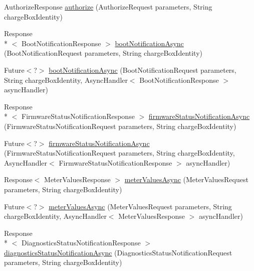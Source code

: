 \begin{DoxyCompactItemize}
\item 
Authorize\-Response \hyperlink{classde_1_1rwth_1_1idsg_1_1steve_1_1ocpp_1_1soap_1_1_central_system_service12___soap_server_a4df12c49aa3af8096172315620f75d17}{authorize} (Authorize\-Request parameters, String charge\-Box\-Identity)
\item 
Response\\*
$<$ Boot\-Notification\-Response $>$ \hyperlink{classde_1_1rwth_1_1idsg_1_1steve_1_1ocpp_1_1soap_1_1_central_system_service12___soap_server_a70ee4ea3b6704da5b35edb7d310dc70f}{boot\-Notification\-Async} (Boot\-Notification\-Request parameters, String charge\-Box\-Identity)
\item 
Future$<$?$>$ \hyperlink{classde_1_1rwth_1_1idsg_1_1steve_1_1ocpp_1_1soap_1_1_central_system_service12___soap_server_a46d588eca89e181d557753e0f094f059}{boot\-Notification\-Async} (Boot\-Notification\-Request parameters, String charge\-Box\-Identity, Async\-Handler$<$ Boot\-Notification\-Response $>$ async\-Handler)
\item 
Response\\*
$<$ Firmware\-Status\-Notification\-Response $>$ \hyperlink{classde_1_1rwth_1_1idsg_1_1steve_1_1ocpp_1_1soap_1_1_central_system_service12___soap_server_a3530a1724bea19fe12907ea213d66edb}{firmware\-Status\-Notification\-Async} (Firmware\-Status\-Notification\-Request parameters, String charge\-Box\-Identity)
\item 
Future$<$?$>$ \hyperlink{classde_1_1rwth_1_1idsg_1_1steve_1_1ocpp_1_1soap_1_1_central_system_service12___soap_server_ac9af19a6af32c1ad99659c70672c4d09}{firmware\-Status\-Notification\-Async} (Firmware\-Status\-Notification\-Request parameters, String charge\-Box\-Identity, Async\-Handler$<$ Firmware\-Status\-Notification\-Response $>$ async\-Handler)
\item 
Response$<$ Meter\-Values\-Response $>$ \hyperlink{classde_1_1rwth_1_1idsg_1_1steve_1_1ocpp_1_1soap_1_1_central_system_service12___soap_server_a22b5641bef20c6319cf69341d5ae3582}{meter\-Values\-Async} (Meter\-Values\-Request parameters, String charge\-Box\-Identity)
\item 
Future$<$?$>$ \hyperlink{classde_1_1rwth_1_1idsg_1_1steve_1_1ocpp_1_1soap_1_1_central_system_service12___soap_server_aca250a53f1df0c625da15b473d19676c}{meter\-Values\-Async} (Meter\-Values\-Request parameters, String charge\-Box\-Identity, Async\-Handler$<$ Meter\-Values\-Response $>$ async\-Handler)
\item 
Response\\*
$<$ Diagnostics\-Status\-Notification\-Response $>$ \hyperlink{classde_1_1rwth_1_1idsg_1_1steve_1_1ocpp_1_1soap_1_1_central_system_service12___soap_server_a5d47f30fcaa8cc3d4bf01401979204ab}{diagnostics\-Status\-Notification\-Async} (Diagnostics\-Status\-Notification\-Request parameters, String charge\-Box\-Identity)

\end{DoxyCompactItemize}
